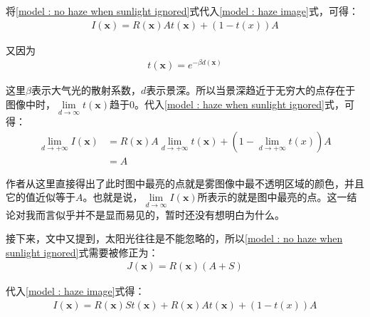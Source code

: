 \documentclass[UTF8]{ctexart}
\begin{document}
                \indent 将\ref{model : no haze when sunlight ignored}式代入\ref{model : haze image}式，可得：
                    \begin{align}
                        I\left( \mathbf{x} \right) = R\left( \mathbf{x} \right)At\left( \mathbf{x} \right) + \left( 1 - t\left( x \right) \right)A \label{model : haze when sunlight ignored}
                    \end{align}
                    
                \indent 又因为
                    \begin{align}
                        t\left( \mathbf{x} \right) = e^{-\beta d\left( \mathbf{x} \right)} \label{model : definition of t}
                    \end{align}
                    
                \indent 这里$\beta$表示大气光的散射系数，$d$表示景深。所以当景深趋近于无穷大的点存在于图像中时，$\mathop{lim}\limits_{d \to \infty}t\left( \mathbf{x} \right)$趋于$0$。代入\ref{model : haze when sunlight ignored}式，可得：
                    \begin{align}
                        \lim_{d \to +\infty}I\left( \mathbf{x} \right) &= R\left( \mathbf{x} \right)A\lim_{d \to +\infty}t\left( \mathbf{x} \right) + \left( 1 - \lim_{d \to +\infty}t\left( x \right) \right)A \\
                        &= A
                    \end{align}
                
                \indent 作者从这里直接得出了此时图中最亮的点就是雾图像中最不透明区域的颜色，并且它的值近似等于$A$。也就是说，$\mathop{lim}\limits_{d \to \infty}I\left( \mathbf{x} \right)$所表示的就是图中最亮的点。这一结论对我而言似乎并不是显而易见的，暂时还没有想明白为什么。
                
                \indent 接下来，文中又提到，太阳光往往是不能忽略的，所以\ref{model : no haze when sunlight ignored}式需要被修正为：
                    \begin{align}
                        J\left( \mathbf{x} \right) = R\left( \mathbf{x} \right)\left( A + S\right) \label{model : no haze when sunlight considered}
                    \end{align}
                    
               \indent 代入\ref{model : haze image}式得：
                    \begin{align}
                        I\left( \mathbf{x} \right) = R\left( \mathbf{x} \right)St\left( \mathbf{x} \right) + R\left( \mathbf{x} \right)At\left( \mathbf{x} \right) + \left( 1 - t\left( x \right) \right)A \label{model : haze when sunlight considered}
                    \end{align}
                    
\end{document}
